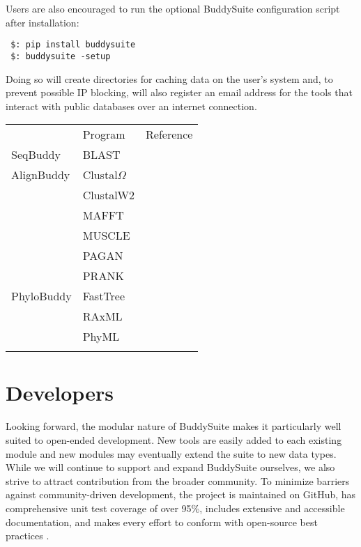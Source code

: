 \documentclass[nogrid]{MBE_article}%
\begin{document}
Users are also encouraged to run the optional BuddySuite configuration script after installation:

\smallskip
{\small
\begin{verbatim}
 $: pip install buddysuite
 $: buddysuite -setup
\end{verbatim}
}
\smallskip

Doing so will create directories for caching data on the user's system and, to prevent possible IP blocking, will also register an email address for the tools that interact with public databases over an internet connection.

\begin{table}[!t]
      {\tabcolsep=5pt\begin{tabular}{@{\extracolsep{\fill}}lll@{}}
      \toprule
	   						& Program								& Reference
      \\\colrule
      SeqBuddy				& BLAST 								& \cite{Camacho2009}
      \\\colrule
      AlignBuddy			& Clustal$\Omega$						& \cite{Sievers:2011fn} \\
        					& ClustalW2 							& \cite{Larkin:2007hz} \\
							& MAFFT 								& \cite{Katoh:2013hm} \\
							& MUSCLE 								& \cite{Edgar:2004bo} \\
							& PAGAN 								& \cite{Loytynoja:2012fy} \\
        					& PRANK 								& \cite{Loytynoja:2005cb}		
      \\\colrule
      PhyloBuddy			& FastTree								& \cite{Price:2010eg} \\
        					& RAxML 								& \cite{Stamatakis:2006de} \\
        					& PhyML 								& \cite{Guindon:2010gf}
      \\\botrule
      \end{tabular}}
{}
\end{table}

\section{Developers}
Looking forward, the modular nature of BuddySuite makes it particularly well suited to open-ended development. New tools are easily added to each existing module and new modules may eventually extend the suite to new data types. While we will continue to support and expand BuddySuite ourselves, we also strive to attract contribution from the broader community. To minimize barriers against community-driven development, the project is maintained on GitHub, has comprehensive unit test coverage of over 95\%, includes extensive and accessible documentation, and makes every effort to conform with open-source best practices \cite{Leprevost:2014gx,Seemann:2013ci}.
\end{document}
